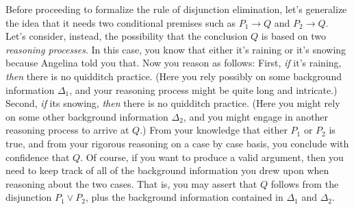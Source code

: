 Before proceeding to formalize the rule of disjunction elimination,
let's generalize the idea that it needs two conditional premises such
as $P_1\to Q$ and $P_2\to Q$.  Let's consider, instead, the
possibility that the conclusion $Q$ is based on two {\it reasoning
  processes}.  In this case, you know that either it's raining or it's
snowing because Angelina told you that.  Now you reason as follows:
First, {\it if} it's raining, {\it then} there is no quidditch
practice.  (Here you rely possibly on some background information
$\Delta _1$, and your reasoning process might be quite long and
intricate.)  Second, {\it if} its snowing, {\it then} there is no
quidditch practice.  (Here you might rely on some other background
information $\Delta _2$, and you might engage in another reasoning
process to arrive at $Q$.)  From your knowledge that either $P_1$ or
$P_2$ is true, and from your rigorous reasoning on a case by case
basis, you conclude with confidence that $Q$.  Of course, if you want
to produce a valid argument, then you need to keep track of all of the
background information you drew upon when reasoning about the two
cases.  That is, you may assert that $Q$ follows from the disjunction
$P_1\vee P_2$, plus the background information contained in
$\Delta _1$ and $\Delta _2$.


